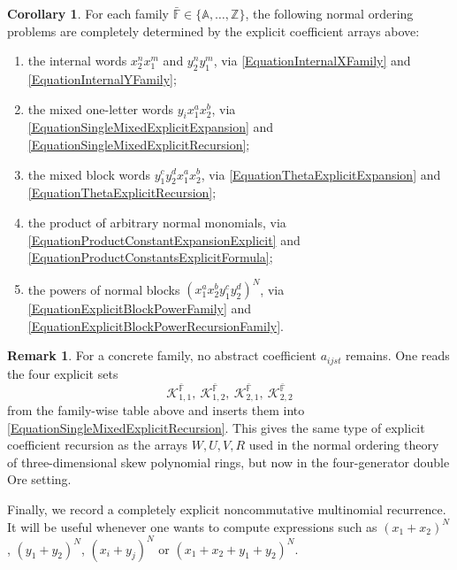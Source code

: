 \documentclass{amsart}
\theoremstyle{definition}
\newtheorem{corollary}[theorem]{Corollary}
\newtheorem{remark}[theorem]{Remark}
\theoremstyle{remark}
\numberwithin{equation}{section}
\begin{document}
\begin{corollary}\label{CorollaryFullNormalOrderingFamily}
For each family $\bar{\mathbb{F}}\in\{\mathbb{A},\ldots,\mathbb{Z}\}$, the following normal ordering problems are completely determined by the explicit coefficient arrays above:
\begin{enumerate}
    \item[\rm (1)] the internal words $x_2^nx_1^m$ and $y_2^ny_1^m$, via \eqref{EquationInternalXFamily} and \eqref{EquationInternalYFamily};
    \item[\rm (2)] the mixed one-letter words $y_ix_1^ax_2^b$, via \eqref{EquationSingleMixedExplicitExpansion} and \eqref{EquationSingleMixedExplicitRecursion};
    \item[\rm (3)] the mixed block words $y_1^cy_2^dx_1^ax_2^b$, via \eqref{EquationThetaExplicitExpansion} and \eqref{EquationThetaExplicitRecursion};
    \item[\rm (4)] the product of arbitrary normal monomials, via \eqref{EquationProductConstantExpansionExplicit} and \eqref{EquationProductConstantsExplicitFormula};
    \item[\rm (5)] the powers of normal blocks $(x_1^ax_2^by_1^cy_2^d)^N$, via \eqref{EquationExplicitBlockPowerFamily} and \eqref{EquationExplicitBlockPowerRecursionFamily}.
\end{enumerate}
\end{corollary}

\begin{remark}\label{RemarkHowToReadFamilies}
For a concrete family, no abstract coefficient $a_{ijst}$ remains. One reads the four explicit sets
\[
\mathscr{K}_{1,1}^{\bar{\mathbb{F}}},\
\mathscr{K}_{1,2}^{\bar{\mathbb{F}}},\
\mathscr{K}_{2,1}^{\bar{\mathbb{F}}},\
\mathscr{K}_{2,2}^{\bar{\mathbb{F}}}
\]
from the family-wise table above and inserts them into \eqref{EquationSingleMixedExplicitRecursion}. This gives the same type of explicit coefficient recursion as the arrays $W,U,V,R$ used in the normal ordering theory of three-dimensional skew polynomial rings, but now in the four-generator double Ore setting.
\end{remark}

Finally, we record a completely explicit noncommutative multinomial recurrence. It will be useful whenever one wants to compute expressions such as $(x_1+x_2)^N$, $(y_1+y_2)^N$, $(x_i+y_j)^N$ or $(x_1+x_2+y_1+y_2)^N$.
\end{document}
